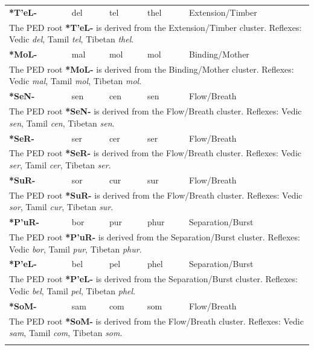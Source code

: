 \begin{longtable}{p{} p{} p{} p{} p{}}
\textbf{*T'eL-} & del & tel & thel & Extension/Timber \\ 
\multicolumn{5}{p{\textwidth}}{\small The PED root \textbf{*T'eL-} is derived from the Extension/Timber cluster. Reflexes: Vedic \textit{del}, Tamil \textit{tel}, Tibetan \textit{thel}. } \\ \addlinespace 
\textbf{*MoL-} & mal & mol & mol & Binding/Mother \\ 
\multicolumn{5}{p{\textwidth}}{\small The PED root \textbf{*MoL-} is derived from the Binding/Mother cluster. Reflexes: Vedic \textit{mal}, Tamil \textit{mol}, Tibetan \textit{mol}. } \\ \addlinespace 
\textbf{*SeN-} & sen & cen & sen & Flow/Breath \\ 
\multicolumn{5}{p{\textwidth}}{\small The PED root \textbf{*SeN-} is derived from the Flow/Breath cluster. Reflexes: Vedic \textit{sen}, Tamil \textit{cen}, Tibetan \textit{sen}. } \\ \addlinespace 
\textbf{*SeR-} & ser & cer & ser & Flow/Breath \\ 
\multicolumn{5}{p{\textwidth}}{\small The PED root \textbf{*SeR-} is derived from the Flow/Breath cluster. Reflexes: Vedic \textit{ser}, Tamil \textit{cer}, Tibetan \textit{ser}. } \\ \addlinespace 
\textbf{*SuR-} & sor & cur & sur & Flow/Breath \\ 
\multicolumn{5}{p{\textwidth}}{\small The PED root \textbf{*SuR-} is derived from the Flow/Breath cluster. Reflexes: Vedic \textit{sor}, Tamil \textit{cur}, Tibetan \textit{sur}. } \\ \addlinespace 
\textbf{*P'uR-} & bor & pur & phur & Separation/Burst \\ 
\multicolumn{5}{p{\textwidth}}{\small The PED root \textbf{*P'uR-} is derived from the Separation/Burst cluster. Reflexes: Vedic \textit{bor}, Tamil \textit{pur}, Tibetan \textit{phur}. } \\ \addlinespace 
\textbf{*P'eL-} & bel & pel & phel & Separation/Burst \\ 
\multicolumn{5}{p{\textwidth}}{\small The PED root \textbf{*P'eL-} is derived from the Separation/Burst cluster. Reflexes: Vedic \textit{bel}, Tamil \textit{pel}, Tibetan \textit{phel}. } \\ \addlinespace 
\textbf{*SoM-} & sam & com & som & Flow/Breath \\ 
\multicolumn{5}{p{\textwidth}}{\small The PED root \textbf{*SoM-} is derived from the Flow/Breath cluster. Reflexes: Vedic \textit{sam}, Tamil \textit{com}, Tibetan \textit{som}. } \\ \addlinespace 

\end{longtable}
